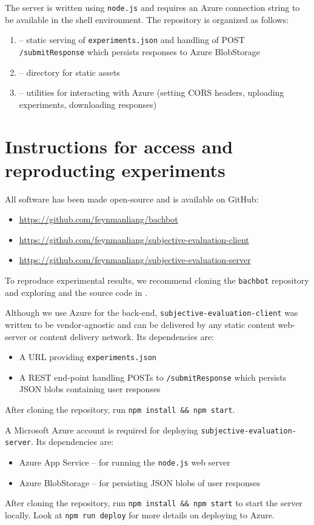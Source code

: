 The server is written using \texttt{node.js} and requires an Azure connection string to be
available in the shell environment. The repository is organized as follows:
\begin{enumerate}
    \item {} -- static serving of \texttt{experiments.json} and handling
        of POST \texttt{/submitResponse} which persists responses to Azure BlobStorage
    \item {} -- directory for static assets
    \item {} -- utilities for interacting with Azure (\eg setting CORS headers,
        uploading experiments, downloading responses)
\end{enumerate}

\section{Instructions for access and reproducting experiments}

All software has been made open-source and is available on GitHub:
\begin{itemize}
    \item \url{https://github.com/feynmanliang/bachbot}
    \item \url{https://github.com/feynmanliang/subjective-evaluation-client}
    \item \url{https://github.com/feynmanliang/subjective-evaluation-server}
\end{itemize}

To reproduce experimental results, we recommend cloning the \texttt{bachbot} repository
and exploring  and the source code in .

Although we use Azure for the back-end, \texttt{subjective-evaluation-client}
was written to be vendor-agnostic and can be delivered by any static content
web-server or content delivery network. Its dependencies are:
\begin{itemize}
    \item A URL providing \texttt{experiments.json}
    \item A REST end-point handling POSTs to \texttt{/submitResponse} which persists
        JSON blobs containing user responses
\end{itemize}
After cloning the repository, run \texttt{npm install && npm start}.

A Microsoft Azure account is required for deploying \texttt{subjective-evaluation-server}.
Its dependencies are:
\begin{itemize}
    \item Azure App Service -- for running the \texttt{node.js} web server
    \item Azure BlobStorage -- for persisting JSON blobs of user responses
\end{itemize}
After cloning the repository, run \texttt{npm install && npm start} to start the server
locally. Look at \texttt{npm run deploy} for more details on deploying to Azure.

